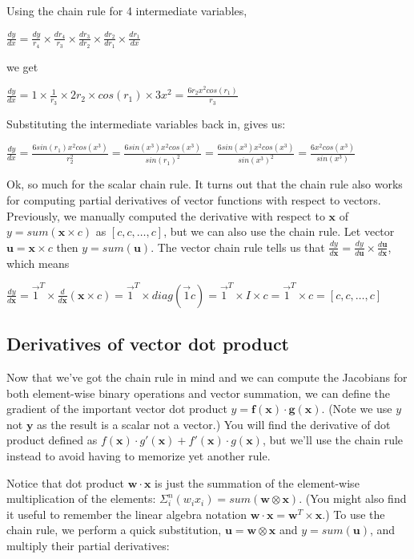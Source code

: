 \documentclass[11pt]{article}
\begin{document}
Using the chain rule for 4 intermediate variables,

$\frac{dy}{dx} = \frac{dy}{r_4} \times \frac{d r_4}{r_3} \times \frac{dr_3}{d r_2} \times \frac{dr_2}{dr_1} \times \frac{dr_1}{dx}$

we get

$\frac{dy}{dx} = 1 \times \frac{1}{r_3} \times 2r_2 \times cos(r_1) \times 3x^2 = \frac{6r_2x^2cos(r_1)}{r_3}$

Substituting the intermediate variables back in, gives us:

$\frac{dy}{dx} = \frac{6sin(r_1)x^2cos(x^3)}{r_2^2} = \frac{6sin(x^3)x^2cos(x^3)}{sin(r_1)^2} = \frac{6sin(x^3)x^2cos(x^3)}{sin(x^3)^2} = \frac{6x^2cos(x^3)}{sin(x^3)}$

Ok, so much for the scalar chain rule. It turns out that the chain rule also works for computing partial derivatives of vector functions with respect to vectors.  Previously, we manually computed the derivative with respect to $\mathbf{x}$ of $y = sum(\mathbf{x} \times c)$ as $[c, c, \ldots, c]$, but we can also use the chain rule. Let vector $\mathbf{u} = \mathbf{x} \times c$ then $y = sum(\mathbf{u})$. The vector chain rule tells us that $\frac{dy}{d\mathbf{x}} = \frac{dy}{d\mathbf{u}} \times \frac{d\mathbf{u}}{d\mathbf{x}}$, which means 

$\frac{dy}{d\mathbf{x}} = \vec{1}^T \times \frac{d}{d\mathbf{x}} (\mathbf{x} \times c) = \vec{1}^T \times diag(\vec{1}c) = \vec{1}^T \times I \times c = \vec{1}^T \times c = [c, c, \ldots, c]$

\subsection{Derivatives of vector dot product}

Now that we've got the chain rule in mind and we can compute the Jacobians for both element-wise binary operations and vector summation, we can define the gradient of the important vector dot product $y = \mathbf{f(x)} \cdot \mathbf{g(x)}$. (Note we use $y$ not $\mathbf{y}$ as the result is a scalar not a vector.) You will find the derivative of dot product defined as $f(\mathbf{x}) \cdot g'(\mathbf{x}) + f'(\mathbf{x}) \cdot g(\mathbf{x})$, but we'll use the chain rule instead to avoid having to memorize yet another rule.

Notice that dot product $\mathbf{w} \cdot \mathbf{x}$ is just the summation of the element-wise multiplication of the elements: $\Sigma_i^n (w_i x_i) = sum(\mathbf{w} \otimes \mathbf{x})$. (You might also find it useful to remember the linear algebra notation $\mathbf{w} \cdot \mathbf{x} = \mathbf{w}^{T} \times \mathbf{x}$.)  To use the chain rule, we perform a quick substitution, $\mathbf{u} = \mathbf{w} \otimes \mathbf{x}$ and $y = sum(\mathbf{u})$, and multiply their partial derivatives:
\end{document}
